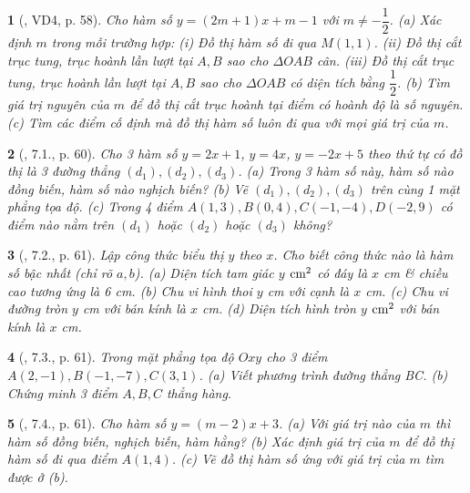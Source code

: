 \documentclass{article}
\newtheorem{baitoan}{}
\begin{document}
\begin{baitoan}[\cite{Binh_boi_duong_Toan_9_tap_1}, VD4, p. 58]
	Cho hàm số $y = (2m + 1)x + m - 1$ với $m\ne-\dfrac{1}{2}$. (a) Xác định $m$ trong mỗi trường hợp: (i) Đồ thị hàm số đi qua $M(1,1)$. (ii) Đồ thị cắt trục tung, trục hoành lần lượt tại $A,B$ sao cho $\Delta OAB$ cân. (iii) Đồ thị cắt trục tung, trục hoành lần lượt tại $A,B$ sao cho $\Delta OAB$ có diện tích bằng $\dfrac{1}{2}$. (b) Tìm giá trị nguyên của $m$ để đồ thị cắt trục hoành tại điểm có hoành độ là số nguyên. (c) Tìm các điểm cố định mà đồ thị hàm số luôn đi qua với mọi giá trị của $m$.
\end{baitoan}

\begin{baitoan}[\cite{Binh_boi_duong_Toan_9_tap_1}, 7.1., p. 60]
	Cho 3 hàm số $y = 2x + 1$, $y = 4x$, $y = -2x + 5$ theo thứ tự có đồ thị là 3 đường thẳng $(d_1),(d_2),(d_3)$. (a) Trong 3 hàm số này, hàm số nào đồng biến, hàm số nào nghịch biến? (b) Vẽ $(d_1),(d_2),(d_3)$ trên cùng 1 mặt phẳng tọa độ. (c) Trong 4 điểm $A(1,3),B(0,4),C(-1,-4),D(-2,9)$ có điểm nào nằm trên $(d_1)$ hoặc $(d_2)$ hoặc $(d_3)$ không?
\end{baitoan}

\begin{baitoan}[\cite{Binh_boi_duong_Toan_9_tap_1}, 7.2., p. 61]
	Lập công thức biểu thị $y$ theo $x$. Cho biết công thức nào là hàm số bậc nhất (chỉ rõ $a,b$). (a) Diện tích tam giác $y$ $\rm cm^2$ có đáy là $x$ {\rm cm} \& chiều cao tương ứng là {\rm6 cm}. (b) Chu vi hình thoi $y$ {\rm cm} với cạnh là $x$ {\rm cm}. (c) Chu vi đường tròn $y$ {\rm cm} với bán kính là $x$ {\rm cm}. (d) Diện tích hình tròn $y$ $\rm cm^2$ với bán kính là $x$ {\rm cm}.
\end{baitoan}

\begin{baitoan}[\cite{Binh_boi_duong_Toan_9_tap_1}, 7.3., p. 61]
	Trong mặt phẳng tọa độ $Oxy$ cho 3 điểm $A(2,-1),B(-1,-7),C(3,1)$. (a) Viết phương trình đường thẳng BC. (b) Chứng minh 3 điểm $A,B,C$ thẳng hàng.
\end{baitoan}

\begin{baitoan}[\cite{Binh_boi_duong_Toan_9_tap_1}, 7.4., p. 61]
	Cho hàm số $y = (m - 2)x + 3$. (a) Với giá trị nào của $m$ thì hàm số đồng biến, nghịch biến, hàm hằng? (b) Xác định giá trị của $m$ để đồ thị hàm số đi qua điểm $A(1,4)$. (c) Vẽ đồ thị hàm số ứng với giá trị của $m$ tìm được ở (b).
\end{baitoan}
\end{document}
